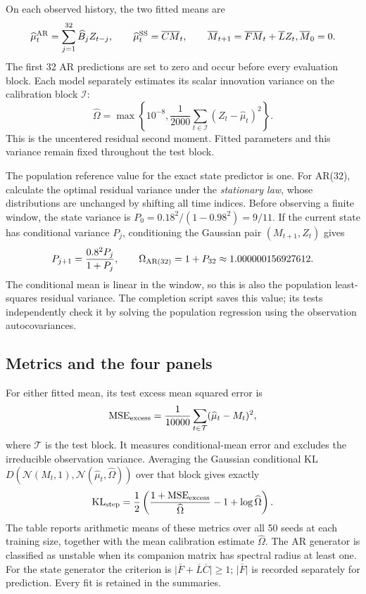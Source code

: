 \documentclass[11pt,twoside]{article}
\theoremstyle{definition}
\theoremstyle{remark}
\begin{document}
On each observed history, the two fitted means are
\[
 \widehat\mu_t^{\rm AR}=\sum_{j=1}^{32}\widehat B_jZ_{t-j},\qquad
 \widehat\mu_t^{\rm SS}=\overline C\overline M_t,\qquad
 \overline M_{t+1}=\overline F\overline M_t+\overline LZ_t,
 \quad\overline M_0=0.
\]
The first 32 AR predictions are set to zero and occur before every
evaluation block. Each model separately estimates its scalar innovation
variance on the calibration block \(\mathcal I\):
\[
 \widehat\Omega
 =\max\left\{10^{-8},\frac1{2000}
 \sum_{t\in\mathcal I}(Z_t-\widehat\mu_t)^2\right\}.
\]
This is the uncentered residual second moment. Fitted parameters and
this variance remain fixed throughout the test block.

The population reference value for the exact state predictor is one.
For AR(32), calculate the optimal residual variance under the
\emph{stationary law}, whose distributions are unchanged by shifting
all time indices. Before observing a finite window, the state variance is
\(P_0=0.18^2/(1-0.98^2)=9/11\). If the current state has conditional
variance \(P_j\), conditioning the Gaussian pair
\((M_{t+1},Z_t)\) gives
\[
 P_{j+1}=\frac{0.8^2P_j}{1+P_j},\qquad
 \Omega_{\rm AR(32)}=1+P_{32}
 \approx1.000000156927612.
\]
The conditional mean is linear in the window, so this is also the
population least-squares residual variance. The completion script
saves this value; its tests independently check it by solving the
population regression using the observation autocovariances.

\subsection{Metrics and the four panels}

For either fitted mean, its test excess mean squared error is
\[
 \operatorname{MSE}_{\rm excess}
 =\frac1{10000}\sum_{t\in\mathcal T}(\widehat\mu_t-M_t)^2,
\]
where \(\mathcal T\) is the test block. It measures conditional-mean
error and excludes the irreducible observation variance.
Averaging the Gaussian conditional KL
\(D(\mathcal N(M_t,1),\mathcal N(\widehat\mu_t,\widehat\Omega))\)
over that block gives exactly
\[
 \operatorname{KL}_{\rm step}
 =\frac12\left(\frac{1+\operatorname{MSE}_{\rm excess}}
 {\widehat\Omega}-1+\log\widehat\Omega\right).
\]
The table reports arithmetic means of these metrics over all 50 seeds
at each training size, together with the mean calibration estimate
\(\widehat\Omega\). The AR generator is classified as unstable when
its companion matrix has spectral radius at least one. For the state
generator the criterion is
\(\lvert\overline F+\overline L\overline C\rvert\ge1\);
\(\lvert\overline F\rvert\) is recorded separately for prediction.
Every fit is retained in the summaries.
\end{document}
